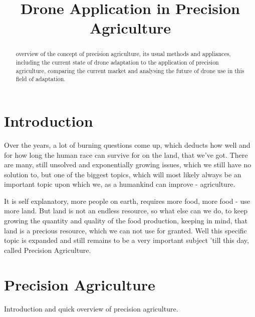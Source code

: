 \documentclass[conference]{IEEEtran}
\begin{document}
\title{Drone Application in Precision Agriculture}

\author{
}

\maketitle

\begin{abstract}
overview of the concept of precision agriculture, its usual methods and appliances, including the current state of drone adaptation to the application of precision agriculture, comparing the current market and analysing the future of drone use in this field of adaptation.
\end{abstract}

\thispagestyle{firstpagefooter}

\section{Introduction}

    Over the years, a lot of burning questions come up, which deducts how well and for how long the human race can survive for on the land, that we've got. There are many, still unsolved and exponentially growing issues, which we still have no solution to, but one of the biggest topics, which will most likely always be an important topic upon which we, as a humankind can improve - agriculture.
    
    It is self explanatory, more people on earth, requires more food, more food - use more land. But land is not an endless resource, so what else can we do, to keep growing the quantity and quality of the food production, keeping in mind, that land is a precious resource, which we can not use for granted. Well this specific topic is expanded and still remains to be a very important subject 'till this day, called Precision Agriculture.

\section{Precision Agriculture}

    Introduction and quick overview of precision agriculture.
\end{document}
